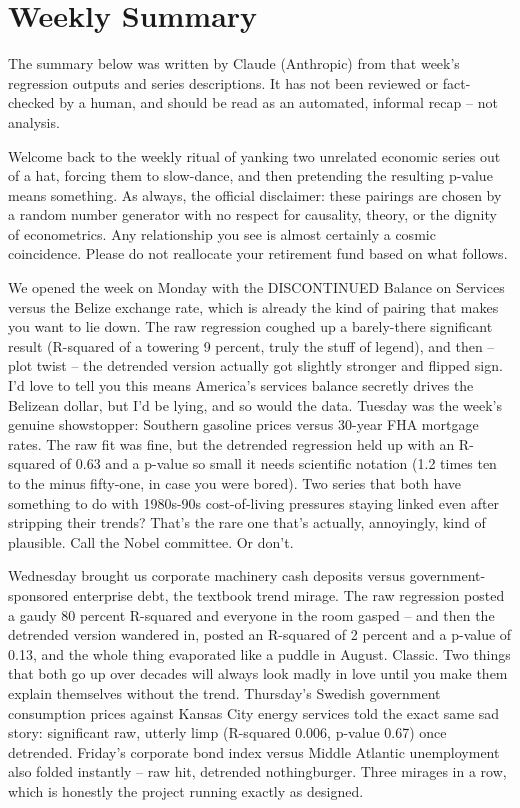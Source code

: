 \section{Weekly Summary}

\begin{tcolorbox}[colback=yellow!10,colframe=black!50,title=AI-Generated Content]
\noindent The summary below was written by Claude (Anthropic) from that week's regression outputs and series descriptions. It has not been reviewed or fact-checked by a human, and should be read as an automated, informal recap -- not analysis.
\end{tcolorbox}

Welcome back to the weekly ritual of yanking two unrelated economic series out of a hat, forcing them to slow-dance, and then pretending the resulting p-value means something. As always, the official disclaimer: these pairings are chosen by a random number generator with no respect for causality, theory, or the dignity of econometrics. Any relationship you see is almost certainly a cosmic coincidence. Please do not reallocate your retirement fund based on what follows.

We opened the week on Monday with the DISCONTINUED Balance on Services versus the Belize exchange rate, which is already the kind of pairing that makes you want to lie down. The raw regression coughed up a barely-there significant result (R-squared of a towering 9 percent, truly the stuff of legend), and then -- plot twist -- the detrended version actually got slightly stronger and flipped sign. I'd love to tell you this means America's services balance secretly drives the Belizean dollar, but I'd be lying, and so would the data. Tuesday was the week's genuine showstopper: Southern gasoline prices versus 30-year FHA mortgage rates. The raw fit was fine, but the detrended regression held up with an R-squared of 0.63 and a p-value so small it needs scientific notation (1.2 times ten to the minus fifty-one, in case you were bored). Two series that both have something to do with 1980s-90s cost-of-living pressures staying linked even after stripping their trends? That's the rare one that's actually, annoyingly, kind of plausible. Call the Nobel committee. Or don't.

Wednesday brought us corporate machinery cash deposits versus government-sponsored enterprise debt, the textbook trend mirage. The raw regression posted a gaudy 80 percent R-squared and everyone in the room gasped -- and then the detrended version wandered in, posted an R-squared of 2 percent and a p-value of 0.13, and the whole thing evaporated like a puddle in August. Classic. Two things that both go up over decades will always look madly in love until you make them explain themselves without the trend. Thursday's Swedish government consumption prices against Kansas City energy services told the exact same sad story: significant raw, utterly limp (R-squared 0.006, p-value 0.67) once detrended. Friday's corporate bond index versus Middle Atlantic unemployment also folded instantly -- raw hit, detrended nothingburger. Three mirages in a row, which is honestly the project running exactly as designed.


